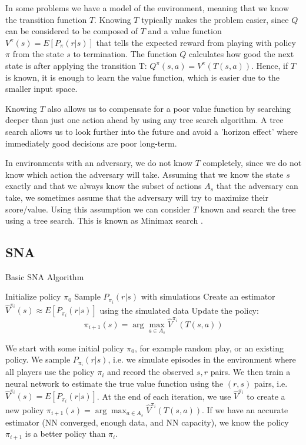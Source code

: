 \documentclass{article}
\begin{document}
In some problems we have a model of the environment, meaning
that we know the transition function $T$.
Knowing $T$ typically makes the problem easier, since $Q$
can be considered to be composed of $T$ and a value function
$V^{\pi}(s) = E[P_\pi(r|s)]$ that tells the expected reward
from playing with policy $\pi$ from the state $s$ to termination.
The function $Q$ calculates how good the next state is after
applying the transition T: $Q^{\pi}(s,a) = V^{\pi}(T(s,a))$.
Hence, if $T$ is known, it is enough to learn the value function,
which is easier due to the smaller input space.

Knowing $T$ also allows us to compensate for a poor value function
by searching deeper than just one action ahead by using any tree
search algorithm. A tree search allows us to look further into the
future and avoid a 'horizon effect' \cite{marsland1991computer}
where immediately good decisions are poor long-term.

In environments with an adversary, we do not know $T$ completely,
since we do not know which action the adversary will take.
Assuming that we know the state $s$ exactly and that we always
know the subset of actions $A_s$ that the adversary can take,
we sometimes assume that the adversary will try to maximize
their score/value. Using this assumption we can consider $T$
known and search the tree using a tree search. This is known
as Minimax search \cite{kiefer1953sequential}.

\subsection{SNA}

\label{SNA}
\begin{algorithm}
\caption{Basic SNA Algorithm}
\label{alg:q-sna}
\begin{algorithmic}[1]
\State Initialize policy $\pi_0$
    \State Sample $P_{\pi_i}(r|s)$ with simulations
    \State Create an estimator $\hat{V}^{\pi_i}(s) \approx E[P_{\pi_i}(r|s)]$ using the simulated data
    \State Update the policy:
    \State $$\pi_{i+1}(s) =  \arg\!\max_{a \in A_s} \hat{V}^{\pi_i}(T(s,a))$$
\EndFor
\end{algorithmic}
\end{algorithm}
We start with some initial policy $\pi_0$, for example random
play, or an existing policy. We sample $P_{\pi_i}(r|s)$, i.e.
we simulate episodes in the environment where all players use
the policy $\pi_i$ and record the observed $s,r$ pairs.
We then train a neural network to estimate the true value function
using the $(r,s)$ pairs, i.e.
$\hat{V}^{\pi_i}(s) = E[P_{\pi_i}(r|s)]$.
At the end of each iteration, we use $\hat{V}^{\pi_i}$ to
create a new policy 
$\pi_{i+1}(s) = \arg\!\max_{a \in A_s} \hat{V}^{\pi_i}(T(s,a))$.
If we have an accurate estimator (NN converged, enough data,
and NN capacity), we know the policy $\pi_{i+1}$ is a better
policy than $\pi_{i}$.
\end{document}
